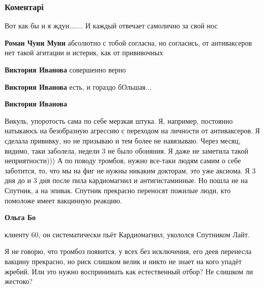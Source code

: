  
 
 
 
 
\subsubsection{Коментарі}
\label{sec:26_10_2021.fb.ivanova_viktoria.doneck.1.covid_privivka_tromboz.cmt}

\begin{itemize} %
Вот как бы и я ждун....... И каждый отвечает самолично за свой нос

\begin{itemize} %
\textbf{Роман Чуни Муни} абсолютно с тобой согласна, но согласись, от антиваксеров нет такой агитации и истерик, как от прививочных

\textbf{Виктория Иванова} совершенно верно

\textbf{Виктория Иванова} есть, и гораздо бОльшая...

\textbf{Виктория Иванова} 

Викуль, упоротость сама по себе мерзкая штука. Я, например, постоянно натыкаюсь
на безобразную агрессию с переходом на личности от антиваксеров. Я сделала
прививку, но не призываю и тем более не навязываю. Через месяц, видимо, таки
заболела, недели 3 не было обоняния. Я даже не заметила такой неприятности))) А
по поводу тромбов, нужно все-таки людям самим о себе заботится, то, что мы на
фиг не нужны никаким докторам, это уже аксиома. Я 3 дня до и 3 дня после пила
кардиомагнил и антигистаминные. Но пошла не на Спутник, а на эпивак. Спутник
прекрасно переносят пожилые люди, кто помоложе имеет вакцинную реакцию.

\textbf{Ольга Бо} 

клиенту 60, он систематически пьёт Кардиомагнил, укололся Спутником Лайт.

Я не говорю, что тромбоз появится, у всех без исключения, его деев перенесла
вакцину прекрасно, но риск слишком велик и никто не знает на кого упадёт
жребий. Или это нужно воспринимать как естественный отбор? Не слишком ли
жестоко?


\end{itemize}
\end{itemize}
